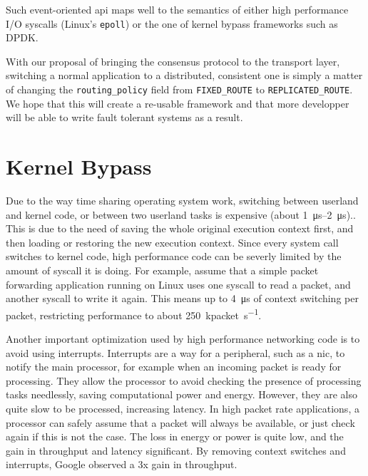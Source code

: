 Such event-oriented \gls{api} maps well to the semantics of either high performance I/O syscalls (\eg Linux's \texttt{epoll}) or the one of kernel bypass frameworks such as DPDK.

\begin{lstfloat}

\end{lstfloat}

\begin{lstfloat}

\end{lstfloat}

With our proposal of bringing the consensus protocol to the transport layer, switching a normal application to a distributed, consistent one is simply a matter of changing the \texttt{routing\_policy} field from \texttt{FIXED\_ROUTE} to \texttt{REPLICATED\_ROUTE}.
We hope that this will create a re-usable framework and that more developper will be able to write fault tolerant systems as a result.

\section{Kernel Bypass}

Due to the way time sharing operating system work, switching between userland and kernel code, or between two userland tasks is expensive (about \SIrange{1}{2}{\micro\second}\cite{measuring_context_switch})..
This is due to the need of saving the whole original execution context first, and then loading or restoring the new execution context.
Since every system call switches to kernel code, high performance code can be severly limited by the amount of syscall it is doing.
For example, assume that a simple packet forwarding application running on Linux uses one syscall to read a packet, and another syscall to write it again.
This means up to \SI{4}{\micro\second} of context switching per packet, restricting performance to about \SI{250}{\kilo packet\per\second}.

Another important optimization used by high performance networking code is to avoid using interrupts.
Interrupts are a way for a peripheral, such as a \gls{nic}, to notify the main processor, for example when an incoming packet is ready for processing.
They allow the processor to avoid checking the presence of processing tasks needlessly, saving computational power and energy.
However, they are also quite slow to be processed, increasing latency.
In high packet rate applications, a processor can safely assume that a packet will always be available, or just check again if this is not the case.
The loss in energy or power is quite low, and the gain in throughput and latency significant.
By removing context switches and interrupts, Google observed a 3x gain in throughput\cite{maglev}.

